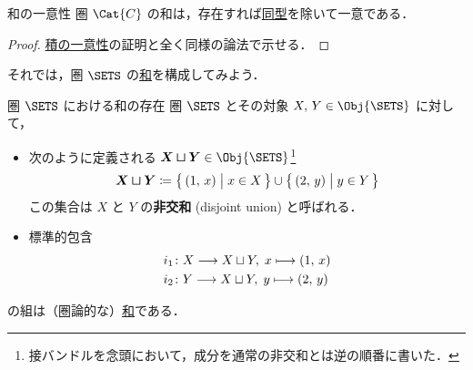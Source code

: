 \documentclass[geometry_main]{subfiles}
\begin{document}
\begin{myprop}[]{和の一意性}
	圏 $\Cat{C}$ の和は，存在すれば\hyperref[def:iso]{同型}を除いて一意である．
\end{myprop}

\begin{proof}
	\hyperref[prop:unique-product]{積の一意性}の証明と全く同様の論法で示せる．
\end{proof}

それでは，圏 $\SETS$ の\hyperref[def:sum]{和}を構成してみよう．
\begin{myprop}[label=prop:sum-sets]{圏 $\SETS$ における和の存在}
	圏 $\SETS$ とその対象 $X,\, Y \in \Obj{\SETS}$ に対して，
	\begin{itemize}
		\item 次のように定義される $\bm{X \sqcup Y} \in \Obj{\SETS}$\footnote{接バンドルを念頭において，成分を通常の非交和とは逆の順番に書いた．}
		\begin{align}
			\bm{X \sqcup Y} \coloneqq \bigl\{\, (1,\, x) \bigm| x \in X \,\bigr\} \cup \bigl\{\, (2,\, y) \bigm| y \in Y \,\bigr\} 
		\end{align}
		この集合は $X$ と $Y$ の\textbf{非交和} (disjoint union) と呼ばれる．
		\item 標準的包含
		\begin{align}
			i_1 &\colon X \longrightarrow X \sqcup Y,\; x \longmapsto (1,\, x) \\
			i_2 &\colon Y \longrightarrow X \sqcup Y,\; y \longmapsto (2,\, y)
		\end{align}
	\end{itemize}
	の組は（圏論的な）\hyperref[def:sum]{和}である．
\end{myprop}
\end{document}
